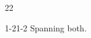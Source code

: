 \documentclass[paper=A4]{ropas-poster}
\begin{document}
\begin{postergrid}{2}{2}
\begin{posterblock}{1-2}{1-2}
Spanning both.
\end{posterblock}
\end{postergrid}
\end{document}
